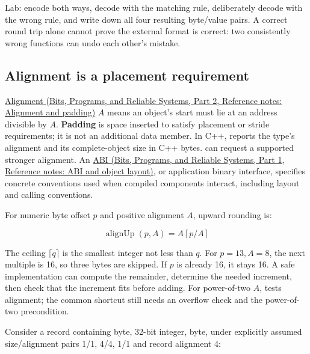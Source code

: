Lab: encode  both ways, decode with the matching rule, deliberately decode with the wrong rule, and write down all four resulting byte/value pairs. A correct round trip alone cannot prove the external format is correct: two consistently wrong functions can undo each other's mistake.

\subsection{Alignment is a placement requirement}\label{05-engine-i-ch002-alignment-is-a-placement-requirement}

\hypertarget{05-engine-i-ch002-alignment-is-a-placement-requirement}{}

\href{../01-Bits-Programs-and-Reliable-Systems-P02/main.pdf\#nameddest=appendix-a1f7c53b4742}{Alignment (Bits, Programs, and Reliable Systems, Part 2, Reference notes: Alignment and padding)} \(A\) means an object's start must lie at an address divisible by \(A\). \textbf{Padding} is space inserted to satisfy placement or stride requirements; it is not an additional data member. In C++,  reports the type's alignment and  its complete-object size in C++ bytes.  can request a supported stronger alignment. An \href{../01-Bits-Programs-and-Reliable-Systems-P01/main.pdf\#nameddest=appendix-c4ac6bb0fff8}{ABI (Bits, Programs, and Reliable Systems, Part 1, Reference notes: ABI and object layout)}, or application binary interface, specifies concrete conventions used when compiled components interact, including layout and calling conventions.

For numeric byte offset \(p\) and positive alignment \(A\), upward rounding is:

\[
\operatorname{alignUp}(p,A)=A\left\lceil p/A\right\rceil
\]

The ceiling \(\lceil q\rceil\) is the smallest integer not less than \(q\). For \(p=13,A=8\), the next multiple is 16, so three bytes are skipped. If \(p\) is already 16, it stays 16. A safe implementation can compute the remainder, determine the needed increment, then check that the increment fits before adding. For power-of-two \(A\),  tests alignment; the common  shortcut still needs an overflow check and the power-of-two precondition.

Consider a record containing byte, 32-bit integer, byte, under explicitly assumed size/alignment pairs 1/1, 4/4, 1/1 and record alignment 4:

